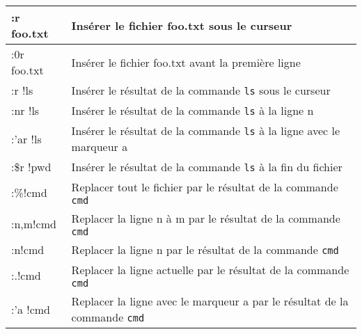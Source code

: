 \documentclass{article}
\begin{document}
                            \begin{tabular}{|p{3cm}| l| }
                                \hline
                                :r foo.txt & Insérer le fichier foo.txt sous le curseur \\ \hline
                                :0r foo.txt & Insérer le fichier foo.txt avant la première ligne \\ \hline
                                :r !ls & Insérer le résultat de la commande \verb?ls?  sous le curseur \\ \hline
                                :nr !ls & Insérer le résultat de la commande \verb?ls? à la ligne n \\ \hline
                                :'ar !ls & Insérer le résultat de la commande \verb?ls? à la ligne avec le marqueur a \\ \hline
                                :\$r !pwd & Insérer le résultat de la commande \verb?ls? à la fin du fichier  \\ \hline
                                :\%!cmd & Replacer tout le fichier par le résultat de la commande \verb?cmd? \\ \hline
                                :n,m!cmd & Replacer la ligne n à m par le résultat de la commande \verb?cmd? \\ \hline
                                :n!cmd & Replacer la ligne n par le résultat de la commande \verb?cmd? \\ \hline
                                :.!cmd & Replacer la ligne actuelle par le résultat de la commande \verb?cmd?\\ \hline
                                :'a !cmd & Replacer la ligne avec le marqueur a par le résultat de la commande \verb?cmd? \\ \hline
                            \end{tabular}\\
\end{document}
